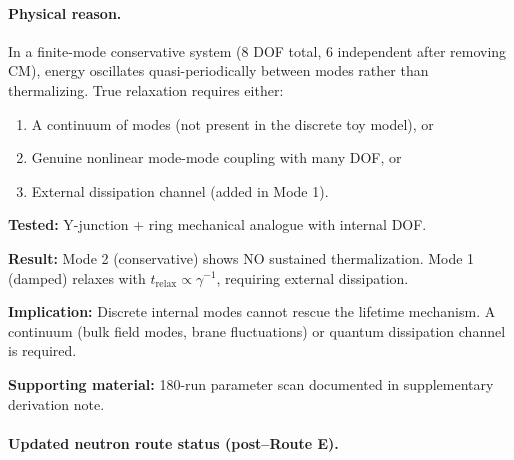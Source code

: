 \paragraph{Physical reason.}
In a finite-mode conservative system (8 DOF total, 6 independent after removing CM),
energy oscillates quasi-periodically between modes rather than thermalizing. True
relaxation requires either:
\begin{enumerate}[nosep]
  \item A continuum of modes (not present in the discrete toy model), or
  \item Genuine nonlinear mode-mode coupling with many DOF, or
  \item External dissipation channel (added in Mode 1).
\end{enumerate}

\begin{tcolorbox}[colback=red!5!white, colframe=red!60!black,
                  title={\textbf{Route E Status: NO-GO}}]
\label{box:routeE_status}

\textbf{Tested:} Y-junction + ring mechanical analogue with internal DOF.

\textbf{Result:} Mode 2 (conservative) shows NO sustained thermalization. Mode 1 (damped) relaxes
with $t_{\mathrm{relax}} \propto \gamma^{-1}$, requiring external dissipation.

\textbf{Implication:} Discrete internal modes cannot rescue the lifetime mechanism. A continuum
(bulk field modes, brane fluctuations) or quantum dissipation channel is required.

\textbf{Supporting material:}
180-run parameter scan documented in supplementary derivation note.
\end{tcolorbox}

\paragraph{Updated neutron route status (post--Route E).}

